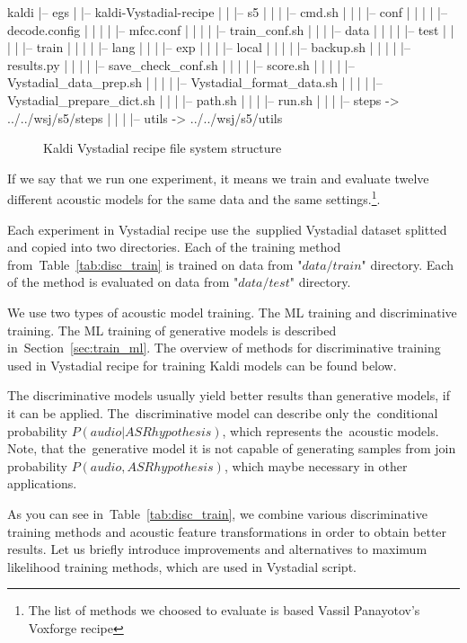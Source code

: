 \tiny\begin{verbbox}
kaldi
|-- egs
|   |-- kaldi-Vystadial-recipe
|   |   |-- s5
|   |   |   |-- cmd.sh
|   |   |   |-- conf
|   |   |   |   |-- decode.config
|   |   |   |   |-- mfcc.conf
|   |   |   |   |-- train_conf.sh
|   |   |   |-- data
|   |   |   |   |-- test 
|   |   |   |   |-- train
|   |   |   |   |-- lang
|   |   |   |-- exp
|   |   |   |-- local
|   |   |   |   |-- backup.sh
|   |   |   |   |-- results.py
|   |   |   |   |-- save_check_conf.sh
|   |   |   |   |-- score.sh
|   |   |   |   |-- Vystadial_data_prep.sh
|   |   |   |   |-- Vystadial_format_data.sh
|   |   |   |   |-- Vystadial_prepare_dict.sh
|   |   |   |-- path.sh
|   |   |   |-- run.sh
|   |   |   |-- steps -> ../../wsj/s5/steps
|   |   |   |-- utils -> ../../wsj/s5/utils
\end{verbbox}
\normalsize

\begin{figure}[!htp]
\centering \theverbbox \caption{\small{Kaldi Vystadial recipe file system structure}}
\label{fig:ascii-box}
\end{figure}

If we say that we run one experiment, it means we train and evaluate twelve different acoustic models 
for the same data and the same settings.\footnote{The list of methods we choosed to evaluate is based Vassil Panayotov's Voxforge recipe}.

Each experiment in Vystadial recipe use the~supplied Vystadial dataset splitted and copied into two directories.
Each of the training method from~Table~\ref{tab:disc_train} is trained on data from "$data/train$" directory.
Each of the method is evaluated on data from "$data/test$" directory.

We use two types of acoustic model training. The \acl{ML} training and discriminative training.
The \ac{ML} training of generative models is described in~Section~\ref{sec:train_ml}.
The overview of methods for discriminative training used in Vystadial recipe for training Kaldi models
can be found below.

The discriminative models usually yield better results than generative models, if it can be applied. 
The~discriminative model can describe only the~conditional probability $P(audio|ASR hypothesis)$,
which represents the~acoustic models.
Note, that the~generative model it is not capable of generating samples from join probability $P(audio, ASR hypothesis)$,
which maybe necessary in other applications. 

As you can see in~Table~\ref{tab:disc_train}, we combine various discriminative training methods
and acoustic feature transformations in order to obtain better results. 
Let us briefly introduce improvements and alternatives to maximum likelihood training methods,
which are used in Vystadial script.

